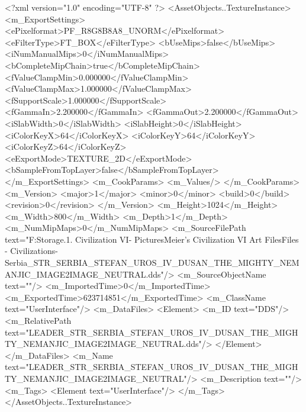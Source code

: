 <?xml version="1.0" encoding="UTF-8" ?>
<AssetObjects..TextureInstance>
	<m_ExportSettings>
		<ePixelformat>PF_R8G8B8A8_UNORM</ePixelformat>
		<eFilterType>FT_BOX</eFilterType>
		<bUseMips>false</bUseMips>
		<iNumManualMips>0</iNumManualMips>
		<bCompleteMipChain>true</bCompleteMipChain>
		<fValueClampMin>0.000000</fValueClampMin>
		<fValueClampMax>1.000000</fValueClampMax>
		<fSupportScale>1.000000</fSupportScale>
		<fGammaIn>2.200000</fGammaIn>
		<fGammaOut>2.200000</fGammaOut>
		<iSlabWidth>0</iSlabWidth>
		<iSlabHeight>0</iSlabHeight>
		<iColorKeyX>64</iColorKeyX>
		<iColorKeyY>64</iColorKeyY>
		<iColorKeyZ>64</iColorKeyZ>
		<eExportMode>TEXTURE_2D</eExportMode>
		<bSampleFromTopLayer>false</bSampleFromTopLayer>
	</m_ExportSettings>
	<m_CookParams>
		<m_Values/>
	</m_CookParams>
	<m_Version>
		<major>1</major>
		<minor>0</minor>
		<build>0</build>
		<revision>0</revision>
	</m_Version>
	<m_Height>1024</m_Height>
	<m_Width>800</m_Width>
	<m_Depth>1</m_Depth>
	<m_NumMipMaps>0</m_NumMipMaps>
	<m_SourceFilePath text="F:\Mod Storage\2.1. Civilization VI\Mods\Archive - Pictures\Sid Meier's Civilization VI Art Files\Art Files - Civilizations\Civilization - Serbia\LEADER_STR_SERBIA_STEFAN_UROS_IV_DUSAN_THE_MIGHTY_NEMANJIC_IMAGE2IMAGE_NEUTRAL.dds"/>
	<m_SourceObjectName text=""/>
	<m_ImportedTime>0</m_ImportedTime>
	<m_ExportedTime>623714851</m_ExportedTime>
	<m_ClassName text="UserInterface"/>
	<m_DataFiles>
		<Element>
			<m_ID text="DDS"/>
			<m_RelativePath text="LEADER_STR_SERBIA_STEFAN_UROS_IV_DUSAN_THE_MIGHTY_NEMANJIC_IMAGE2IMAGE_NEUTRAL.dds"/>
		</Element>
	</m_DataFiles>
	<m_Name text="LEADER_STR_SERBIA_STEFAN_UROS_IV_DUSAN_THE_MIGHTY_NEMANJIC_IMAGE2IMAGE_NEUTRAL"/>
	<m_Description text=""/>
	<m_Tags>
		<Element text="UserInterface"/>
	</m_Tags>
</AssetObjects..TextureInstance>


